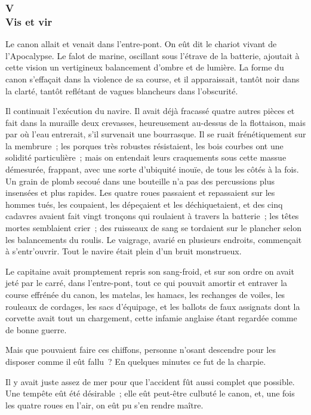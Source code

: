 \documentclass[french,twoside]{book} %
\begin{document}
 \subsubsection[{V. Vis et vir}]{V \\
Vis et vir}
\label{p1l2c5}
\noindent Le canon allait et venait dans l’entre-pont. On eût dit le chariot vivant de l’Apocalypse. Le falot de marine, oscillant sous l’étrave de la batterie, ajoutait à cette vision un vertigineux balancement d’ombre et de lumière. La forme du canon s’effaçait dans la violence de sa course, et il apparaissait, tantôt noir dans la clarté, tantôt reflétant de vagues blancheurs dans l’obscurité.\par
Il continuait l’exécution du navire. Il avait déjà fracassé quatre autres pièces et fait dans la muraille deux crevasses, heureusement au-dessus de la flottaison, mais par où l’eau entrerait, s’il survenait une bourrasque. Il se ruait frénétiquement sur la membrure ; les porques très robustes résistaient, les bois courbes ont une solidité particulière ; mais on entendait leurs craquements sous cette massue démesurée, frappant, avec une sorte d’ubiquité inouïe, de tous les côtés à la fois. Un grain de plomb secoué dans une bouteille n’a pas des percussions plus insensées et plus rapides. Les quatre roues passaient et repassaient  sur les hommes tués, les coupaient, les dépeçaient et les déchiquetaient, et des cinq cadavres avaient fait vingt tronçons qui roulaient à travers la batterie ; les têtes mortes semblaient crier ; des ruisseaux de sang se tordaient sur le plancher selon les balancements du roulis. Le vaigrage, avarié en plusieurs endroits, commençait à s’entr’ouvrir. Tout le navire était plein d’un bruit monstrueux.\par
Le capitaine avait promptement repris son sang-froid, et sur son ordre on avait jeté par le carré, dans l’entre-pont, tout ce qui pouvait amortir et entraver la course effrénée du canon, les matelas, les hamacs, les rechanges de voiles, les rouleaux de cordages, les sacs d’équipage, et les ballots de faux assignats dont la corvette avait tout un chargement, cette infamie anglaise étant regardée comme de bonne guerre.\par
Mais que pouvaient faire ces chiffons, personne n’osant descendre pour les disposer comme il eût fallu ? En quelques minutes ce fut de la charpie.\par
Il y avait juste assez de mer pour que l’accident fût aussi complet que possible. Une tempête eût été désirable ; elle eût peut-être culbuté le canon, et, une fois les quatre roues en l’air, on eût pu s’en rendre maître.\par
\end{document}
